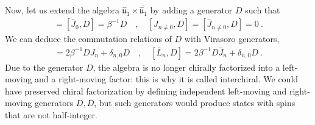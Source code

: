 \documentclass[12pt, a4paper]{article}
\theoremstyle{break}
\begin{document}
Now, let us extend the algebra $\hat{\mathfrak{u}}_1\times \overline{\hat{\mathfrak{u}}_1}$ by adding a generator $D$ such that 
\begin{align}
 [J_0,D] = [\bar J_0,D] = \beta^{-1}D \quad , \quad [J_{n\neq 0},D]=[\bar J_{n\neq 0},D]=0 \ .
\end{align}
We can deduce the commutation relations of $D$ with Virasoro generators,
\begin{align}
 [L_n,D] =2\beta^{-1}DJ_n +\delta_{n,0}D \quad , \quad [\bar L_n,D] =2\beta^{-1}D\bar J_n +\delta_{n,0}D\ .
\end{align}
Due to the generator $D$, the algebra is no longer chirally factorized into a left-moving and a right-moving factor: this is why it is called interchiral. We could have preserved chiral factorization by defining independent left-moving and right-moving generators $D,\bar D$, but such generators would produce states with spins that are not half-integer. 
\end{document}
